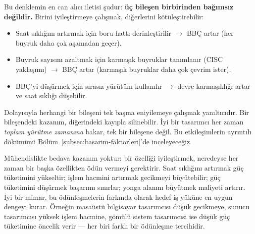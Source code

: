 Bu denklemin en can alıcı iletisi şudur: \textbf{üç bileşen birbirinden bağımsız değildir.} Birini iyileştirmeye çalışmak, diğerlerini kötüleştirebilir:
\begin{itemize}
    \item Saat sıklığını artırmak için boru hattı derinleştirilir $\rightarrow$ BBÇ artar (her buyruk daha çok aşamadan geçer).
    \item Buyruk sayısını azaltmak için karmaşık buyruklar tanımlanır (CISC yaklaşımı) $\rightarrow$ BBÇ artar (karmaşık buyruklar daha çok çevrim ister).
    \item BBÇ'yi düşürmek için sırasız yürütüm kullanılır $\rightarrow$ devre karmaşıklığı artar ve saat sıklığı düşebilir.
\end{itemize}

Dolayısıyla herhangi bir bileşeni tek başına eniyilemeye çalışmak yanıltıcıdır. Bir bileşendeki kazanım, diğerindeki kayıpla silinebilir. İyi bir tasarımcı her zaman \emph{toplam yürütme zamanına} bakar, tek bir bileşene değil. Bu etkileşimlerin ayrıntılı dökümünü Bölüm~\ref{subsec:basarim-faktorleri}'de inceleyeceğiz.

\begin{tanim}
Mühendislikte bedava kazanım yoktur: bir özelliği iyileştirmek, neredeyse her zaman bir başka özellikten ödün vermeyi gerektirir. Saat sıklığını artırmak güç tüketimini yükseltir; işlem hacmini artırmak gecikmeyi büyütebilir; güç tüketimini düşürmek başarımı sınırlar; yonga alanını büyütmek maliyeti artırır. İyi bir mimar, bu ödünleşmelerin farkında olarak hedef iş yüküne en uygun dengeyi kurar. Örneğin masaüstü bilgisayar tasarımcısı düşük gecikmeye, sunucu tasarımcısı yüksek işlem hacmine, gömülü sistem tasarımcısı ise düşük güç tüketimine öncelik verir --- her biri farklı bir ödünleşme tercihidir.
\end{tanim}

